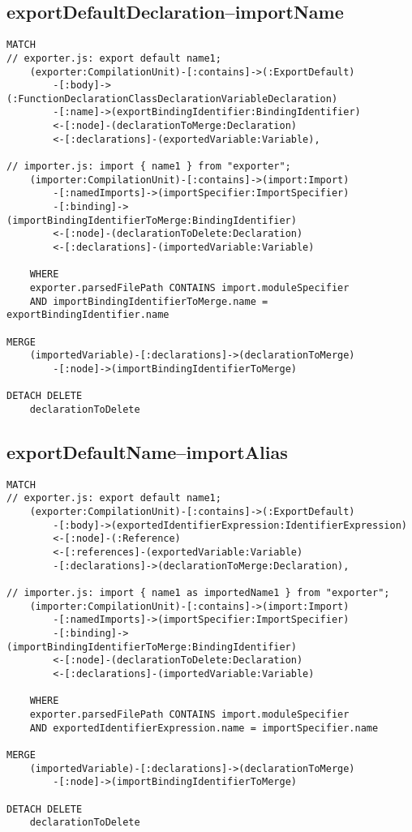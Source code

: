\newpage
\subsection{exportDefaultDeclaration–importName}
\begin{lstlisting}[language=Cypher]
MATCH
// exporter.js: export default name1;
    (exporter:CompilationUnit)-[:contains]->(:ExportDefault)
        -[:body]->(:FunctionDeclarationClassDeclarationVariableDeclaration)
        -[:name]->(exportBindingIdentifier:BindingIdentifier)
        <-[:node]-(declarationToMerge:Declaration)
        <-[:declarations]-(exportedVariable:Variable),

// importer.js: import { name1 } from "exporter";
    (importer:CompilationUnit)-[:contains]->(import:Import)
        -[:namedImports]->(importSpecifier:ImportSpecifier)
        -[:binding]->(importBindingIdentifierToMerge:BindingIdentifier)
        <-[:node]-(declarationToDelete:Declaration)
        <-[:declarations]-(importedVariable:Variable)

    WHERE
    exporter.parsedFilePath CONTAINS import.moduleSpecifier
    AND importBindingIdentifierToMerge.name = exportBindingIdentifier.name

MERGE
    (importedVariable)-[:declarations]->(declarationToMerge)
        -[:node]->(importBindingIdentifierToMerge)

DETACH DELETE
    declarationToDelete
\end{lstlisting}


\newpage
\subsection{exportDefaultName–importAlias}
\begin{lstlisting}[language=Cypher]
MATCH
// exporter.js: export default name1;
    (exporter:CompilationUnit)-[:contains]->(:ExportDefault)
        -[:body]->(exportedIdentifierExpression:IdentifierExpression)
        <-[:node]-(:Reference)
        <-[:references]-(exportedVariable:Variable)
        -[:declarations]->(declarationToMerge:Declaration),

// importer.js: import { name1 as importedName1 } from "exporter";
    (importer:CompilationUnit)-[:contains]->(import:Import)
        -[:namedImports]->(importSpecifier:ImportSpecifier)
        -[:binding]->(importBindingIdentifierToMerge:BindingIdentifier)
        <-[:node]-(declarationToDelete:Declaration)
        <-[:declarations]-(importedVariable:Variable)

    WHERE
    exporter.parsedFilePath CONTAINS import.moduleSpecifier
    AND exportedIdentifierExpression.name = importSpecifier.name

MERGE
    (importedVariable)-[:declarations]->(declarationToMerge)
        -[:node]->(importBindingIdentifierToMerge)

DETACH DELETE
    declarationToDelete
\end{lstlisting}


